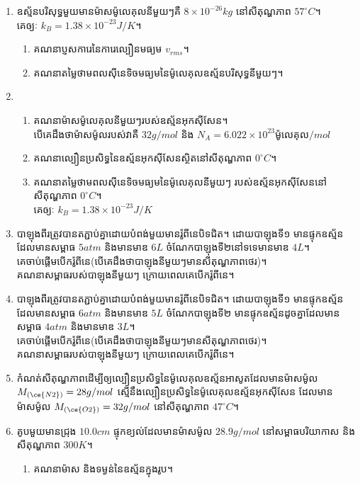 \begin{enumerate}[m]
\item ឧស្ម័នបរិសុទ្ធមួយមានម៉ាសម៉ូលេគុលនីមួយៗគឺ $8\times10^{-26}kg$ នៅសីតុណ្ហភាព $57^\circ C$។​\\ គេឲ្យៈ $k_{B}=1.38\times10^{-23}J/K$។
\begin{enumerate}[k]
	\item គណនាប្ញសការេនៃការេល្បឿនមធ្យម $v_{rms}$។
	\item គណនាតម្លៃថាមពលសុីនេទិចមធ្យមនៃម៉ូលេគុលឧស្ម័នបរិសុទ្ធនីមួយៗ។
\end{enumerate}
\item \begin{enumerate}
	\item គណនាម៉ាសម៉ូលេគុលនីមួយៗរបស់ឧស្ម័នអុកសុីសែន។\\ បើគេដឹងថាម៉ាសម៉ូលរបស់វាគឺ $32g/mol$ និង $N_{A}=6.022\times10^{23}$ម៉ូលេគុល$/mol$
	\item គណនាល្បឿនប្រសិទ្ធនៃឧស្ម័នអុកសុីសែនស្ថិតនៅសីតុណ្ហភាព $0^\circ C$។
	\item គណនាតម្លៃថាមពលសុីនេទិចមធ្យមនៃម៉ូលេគុលនីមួយៗ របស់ឧស្ម័នអុកសុីសែននៅសីតុណ្ហភាព $0^\circ C$។\\ គេឲ្យៈ $k_{B}=1.38\times10^{-23}J/K$
\end{enumerate}
\item បាឡុងពីរត្រូវបានតភ្ជាប់គ្នាដោយបំពង់មួយមានរ៉ូពីនេបិទជិត។ ដោយបាឡុងទី១ មានផ្ទុកឧស្ម័នដែលមានសម្ពាធ $5atm$ និងមានមាឌ $6L$ ចំណែកបាឡុងទី២នៅទទេមានមាឌ $4L$។\\ គេចាប់ផ្តើមបើករ៉ូពីនេ(បើគេដឹងថាបាឡុងនីមួយៗមានសីតុណ្ហភាពថេរ)។\\ គណនាសម្ពាធរបស់បាឡុងនីមួយៗ ក្រោយពេលគេបើករ៉ូពីនេ។
\item បាឡុងពីរត្រូវបានតភ្ជាប់គ្នាដោយបំពង់មួយមានរ៉ូពីនេបិទជិត។ ដោយបាឡុងទី១ មានផ្ទុកឧស្ម័នដែលមានសម្ពាធ $6atm$ និងមានមាឌ $5L$ ចំណែកបាឡុងទី២ មានផ្ទុកឧស្ម័នដូចគ្នាដែលមានសម្ពាធ $4atm$ និងមានមាឌ $3L$។\\ គេចាប់ផ្តើមបើករ៉ូពីនេ(បើគេដឹងថាបាឡុងនីមួយៗមានសីតុណ្ហភាពថេរ)។\\ គណនាសម្ពាធរបស់បាឡុងនីមួយៗ ក្រោយពេលគេបើករ៉ូពីនេ។
\item កំណត់សីតុណ្ហភាពដើម្បីឲ្យល្បឿនប្រសិទ្ធនៃម៉ូលេគុលឧស្ម័នអាសូតដែលមានម៉ាសម៉ូល $M_{\left(\ce{N2}\right)}=28g/mol$ ស្មើនឹងល្បឿនប្រសិទ្ធនៃម៉ូលេគុលឧស្ម័នអុកសុីសែន ដែលមានម៉ាសម៉ូល $M_{\left(\ce{O2}\right)}=32g/mol$ នៅសីតុណ្ហភាព $47^\circ C$។
\item គូបមួយមានជ្រុង $10.0cm$ ផ្ទុកខ្យល់ដែលមានម៉ាសម៉ូល $28.9g/mol$ នៅសម្ពាធបរិយាកាស និងសីតុណ្ហភាព $300K$។
\begin{enumerate}[k]
	\item គណនាម៉ាស និងទម្ងន់នៃឧស្ម័នក្នុងរូប។

\end{enumerate}
\end{enumerate}
